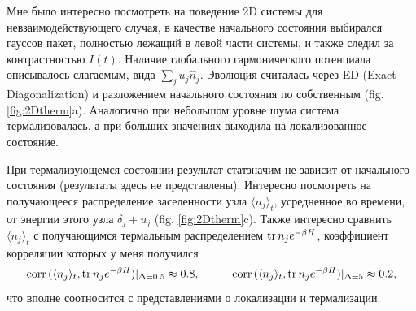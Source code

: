 

Мне было интересно посмотреть на поведение 2D системы для невзаимодействующего случая, в качестве начального состояния выбирался гауссов пакет, полностью лежащий в левой части системы, и также следил за контрастностью $I(t)$.  Наличие глобального гармонического потенциала описывалось слагаемым, вида $\sum_j u_j \hat{n}_j$. Эволюция считалась через ED (Exact Diagonalization) и разложением начального состояния по собственным (fig. \ref{fig:2Dtherm}a). Аналогично при небольшом уровне шума система термализовалась, а при больших значениях выходила на локализованное состояние.  

При термализующемся состоянии результат статзначим не зависит от начального состояния (результаты здесь не представлены). Интересно посмотреть на получающееся распределение заселенности узла $\langle n_j\rangle_t$, усредненное во времени, от энергии этого узла $\delta_j + u_j$ (fig. \ref{fig:2Dtherm}c). Также интересно сравнить $\langle n_j\rangle_t$ с получающимся термальным распределением $\mathop{\mathrm{tr}}\nolimits n_j e^{-\beta H}$, коэффициент корреляции которых у меня получился 
\begin{equation*}
    \text{corr}\,(\langle n_j\rangle_t, \tr n_j e^{-\beta H})|_{\Delta=0.5}  \approx 0.8,
    \hspace{10 mm} 
    \text{corr}\,(\langle n_j\rangle_t, \tr n_j e^{-\beta H})|_{\Delta=5}  \approx 0.2,
\end{equation*}
что вполне соотносится с представлениями о локализации и термализации. 



